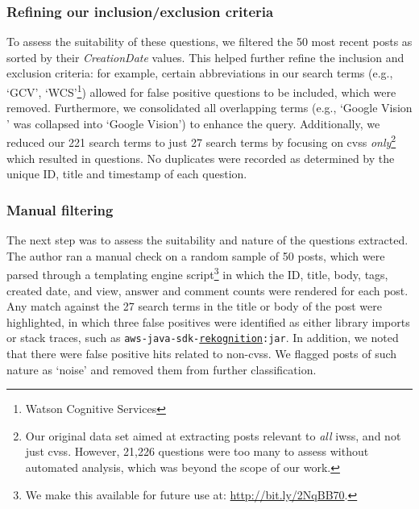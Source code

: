 \subsubsection{Refining our inclusion/exclusion criteria}
\label{semotion2020:ssec:method:filtering:refining}

To assess the suitability of these questions, we filtered the 50 most recent posts as sorted by their \textit{CreationDate} values. This helped further refine the inclusion and exclusion criteria: for example, certain abbreviations in our search terms (e.g., `GCV', `WCS'\footnote{Watson Cognitive Services}) allowed for false positive questions to be included, which were removed. Furthermore, we consolidated all overlapping terms (e.g., `Google Vision \uline{\textbf{}}' was collapsed into `Google Vision') to enhance the query. Additionally, we reduced our 221 search terms to just 27 search terms by focusing on \glspl{cvs} \textit{only}\footnote{Our original data set aimed at extracting posts relevant to \textit{all} \glspl{iws}, and not just \glspl{cvs}. However, 21,226 questions were too many to assess without automated analysis, which was beyond the scope of our work.} which resulted in \SEMNumPostsFromSO{} questions. No duplicates were recorded as determined by the unique ID, title and timestamp of each question.

\subsubsection{Manual filtering}
\label{semotion2020:ssec:method:filtering:automated-manual-filtering}

The next step was to assess the suitability and nature of the \SEMNumPostsFromSO{} questions extracted. The \alexnumauthor{} author ran a manual check on a random sample of 50 posts, which were parsed through a templating engine script\footnote{We make this available for future use at: \url{http://bit.ly/2NqBB70}.} in which the ID, title, body, tags, created date, and view, answer and comment counts were rendered for each post.
Any match against the 27 search terms in the title or body of the post were highlighted, in which three false positives were identified as either library imports or stack traces, such as \texttt{aws-java-sdk-\uline{rekognition}:jar}. In addition, we noted that there were false positive hits related to non-\glspl{cvs}. We flagged posts of such nature as `noise' and removed them from further classification.

